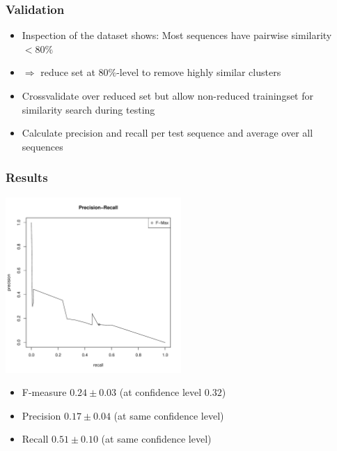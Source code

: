 \documentclass{beamer}
\begin{document}
\begin{frame}
	\frametitle{Validation}
	
	\begin{itemize}
		\item Inspection of the dataset shows: Most sequences have pairwise similarity $< 80\%$
		\item[] $\Rightarrow$ reduce set at $80\%$-level to remove highly similar clusters
		\item Crossvalidate over reduced set but allow non-reduced trainingset for similarity search during testing
		\item Calculate precision and recall per test sequence and average over all sequences
	\end{itemize}
\end{frame}

\begin{frame}
	\frametitle{Results}
	\begin{center}
	\includegraphics[width=0.5\textwidth]{PreRec_5_folds_small.pdf}
	\end{center}
	\begin{itemize}
		\item F-measure $0.24\pm0.03$ (at confidence level $0.32$)
		\item Precision $0.17\pm0.04$ (at same confidence level)
		\item Recall  $0.51\pm0.10$ (at same confidence level)
	\end{itemize}		
	
\end{frame}
\end{document}
